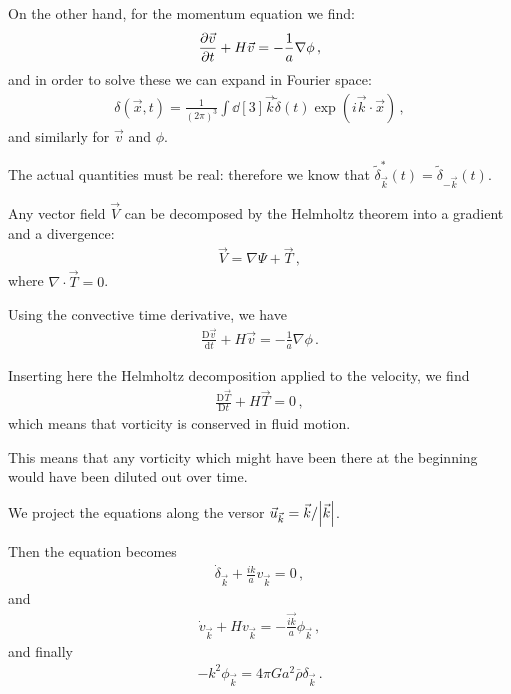 \documentclass[main.tex]{subfiles}
\begin{document}
On the other hand, for the momentum equation we find: 
%
\begin{align}
  \pdv{\vec{v}}{t} + H \vec{v} = - \frac{1}{a} \nabla \phi 
\,,
\end{align}
%
and in order to solve these we can expand in Fourier space: 
%
\begin{align}
  \delta (\vec{x} , t) = 
  \frac{1}{(2 \pi )^3} \int \dd[3]{\vec{k}} \widetilde{\delta} (t) \exp(i \vec{k} \cdot \vec{x})
\,,
\end{align}
%
and similarly for \(\vec{v}\) and \(\phi \). 

The actual quantities must be real: therefore we know that \(\widetilde{\delta}^{*}_{\vec{k}} (t) = \widetilde{\delta}_{-\vec{k}} (t)\).

Any vector field \(\vec{V}\) can be decomposed by the Helmholtz theorem into a gradient and a divergence: 
%
\begin{align}
  \vec{V} = \nabla \Psi + \vec{T}
\,,
\end{align}
%
where \(\nabla \cdot \vec{T} = 0\).

Using the convective time derivative, we have 
%
\begin{align}
  \frac{\mathrm{D} \vec{v}}{\mathrm{d}t} 
  + H \vec{v} = - \frac{1}{a} \nabla \phi 
\,.
\end{align}

Inserting here the Helmholtz decomposition applied to the velocity, we find 
%
\begin{align}
  \frac{\mathrm{D} \vec{T}}{\mathrm{D}t} + H \vec{T} = 0
\,,
\end{align}
%
which means that vorticity is conserved in fluid motion. 

This means that any vorticity which might have been there at the beginning would have been diluted out over time.

We project the equations along the versor \(\vec{u}_{\vec{k}} = \vec{k} / \abs{\vec{k}}\). 

Then the equation becomes 
%
\begin{align}
  \dot{\delta}_{\vec{k}} + \frac{ik}{a} v_{\vec{k}} =0
\,,
\end{align}
%
and 
%
\begin{align}
  \dot{v}_{\vec{k}} + H v_{\vec{k}} = - \frac{\vec{ik}}{a} \phi_{\vec{k}}
  \,,
\end{align}
%
and finally 
%
\begin{align}
  - k^2 \phi_{\vec{k}} = 4 \pi G a^2 \overline{\rho} \delta_{\vec{k}}
\,.
\end{align}
\end{document}
